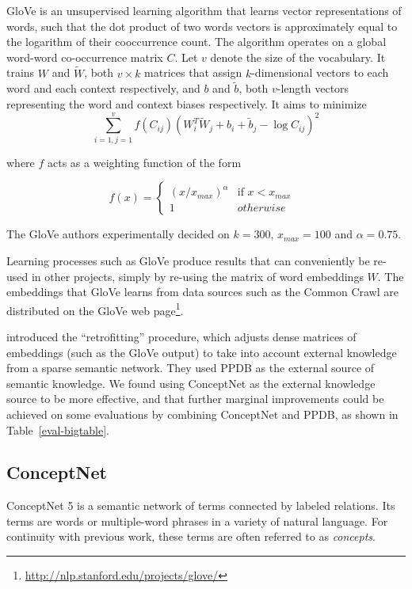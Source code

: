 \documentclass[letterpaper]{article}
\begin{document}
 GloVe \cite{pennington2014glove} is an unsupervised learning algorithm that
 learns vector representations of words, such that the dot product of two words
 vectors is approximately equal to the logarithm of their cooccurrence count.
 The algorithm operates on a global word-word co-occurrence matrix $C$. Let $v$
 denote the size of the vocabulary. It trains $W$ and $\tilde{W}$, both $v
 \times k$ matrices that assign $k$-dimensional vectors to each word and each
 context respectively, and $b$ and $\tilde{b}$, both $v$-length vectors
 representing the word and context biases respectively. It aims to minimize
$$
\sum_{i=1,j=1}^v
  f \left( C_{ij} \right)
  \left( W_i^T \tilde{W}_j + b_i + \tilde{b}_j - \log{C_{ij}} \right)^2
$$

where $f$ acts as a weighting function of the form

$$
f \left( x \right) =
  \begin{cases}
    \left( x / x_{max} \right)^\alpha & \text{if $x < x_{max}$ } \\
    1 & otherwise
  \end{cases}
$$

The GloVe authors experimentally decided on $k=300$, $x_{max}=100$ and
$\alpha=0.75$.

Learning processes such as GloVe produce results that can conveniently be
re-used in other projects, simply by re-using the matrix of word embeddings $W$.
The embeddings that GloVe learns from data sources such as the Common Crawl are
distributed on the GloVe web
page\footnote{\url{http://nlp.stanford.edu/projects/glove/}}.

 introduced the ``retrofitting'' procedure,
which adjusts dense matrices of embeddings (such as the GloVe output) to take
into account external knowledge from a sparse semantic network. They used PPDB
\cite{ganitkevitch2013ppdb} as the external source of semantic knowledge. We
found using ConceptNet as the external knowledge source to be more effective,
and that further marginal improvements could be achieved on some evaluations by
combining ConceptNet and PPDB, as shown in Table~\ref{eval-bigtable}.

\subsection{ConceptNet}
ConceptNet 5 \cite{speer2012conceptnet} is a semantic network of terms
connected by labeled relations. Its terms are words or multiple-word phrases
in a variety of natural language. For continuity with previous work,
these terms are often referred to as {\em concepts}.
\end{document}
